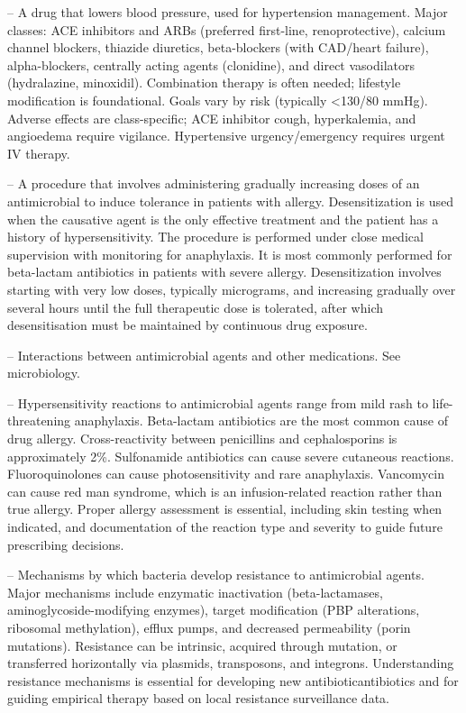 -- A drug that lowers blood pressure, used for hypertension management. Major classes: ACE inhibitors and ARBs (preferred first-line, renoprotective), calcium channel blockers, thiazide diuretics, beta-blockers (with CAD/heart failure), alpha-blockers, centrally acting agents (clonidine), and direct vasodilators (hydralazine, minoxidil). Combination therapy is often needed; lifestyle modification is foundational. Goals vary by risk (typically <130/80 mmHg). Adverse effects are class-specific; ACE inhibitor cough, hyperkalemia, and angioedema require vigilance. Hypertensive urgency/emergency requires urgent IV therapy.

-- A procedure that involves administering gradually increasing doses of an antimicrobial to induce tolerance in patients with allergy. Desensitization is used when the causative agent is the only effective treatment and the patient has a history of hypersensitivity. The procedure is performed under close medical supervision with monitoring for anaphylaxis. It is most commonly performed for beta-lactam antibiotics in patients with severe allergy. Desensitization involves starting with very low doses, typically micrograms, and increasing gradually over several hours until the full therapeutic dose is tolerated, after which desensitisation must be maintained by continuous drug exposure.

-- Interactions between antimicrobial agents and other medications. See microbiology.

-- Hypersensitivity reactions to antimicrobial agents range from mild rash to life-threatening anaphylaxis. Beta-lactam antibiotics are the most common cause of drug allergy. Cross-reactivity between penicillins and cephalosporins is approximately 2\%. Sulfonamide antibiotics can cause severe cutaneous reactions. Fluoroquinolones can cause photosensitivity and rare anaphylaxis. Vancomycin can cause red man syndrome, which is an infusion-related reaction rather than true allergy. Proper allergy assessment is essential, including skin testing when indicated, and documentation of the reaction type and severity to guide future prescribing decisions.

-- Mechanisms by which bacteria develop resistance to antimicrobial agents. Major mechanisms include enzymatic inactivation (beta-lactamases, aminoglycoside-modifying enzymes), target modification (PBP alterations, ribosomal methylation), efflux pumps, and decreased permeability (porin mutations). Resistance can be intrinsic, acquired through mutation, or transferred horizontally via plasmids, transposons, and integrons. Understanding resistance mechanisms is essential for developing new antibioticantibiotics and for guiding empirical therapy based on local resistance surveillance data.

